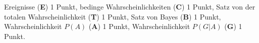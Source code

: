 \begin{bewertung}
Ereignisse ({\bf E}) 1 Punkt,
bedinge Wahrscheinlichkeiten ({\bf C}) 1 Punkt,
Satz von der totalen Wahrscheinlichkeit ({\bf T}) 1 Punkt,
Satz von Bayes ({\bf B}) 1 Punkt,
Wahrscheinlichkeit $P(A)$ ({\bf A}) 1 Punkt,
Wahrscheinlichkeit $P(G|A)$ ({\bf G}) 1 Punkt.
\end{bewertung}



